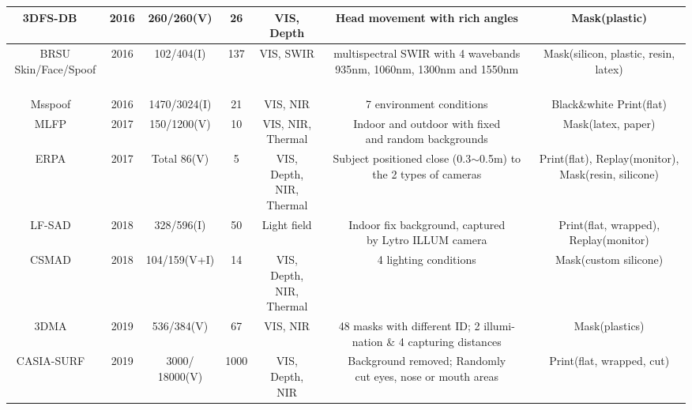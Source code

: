 \documentclass[10pt,journal,compsoc]{IEEEtran}
\begin{document}
\begin{table}
{\begin{tabular}{c c c c c c c}
\midrule
3DFS-DB
~\cite{galbally2016three} & 2016 & 260/260(V) & 26 & VIS, Depth &  Head movement with rich angles & Mask(plastic)\\

 \midrule
\tabincell{c}{BRSU \\ Skin/Face/Spoof}
~\cite{steiner2016reliable} & 2016 & 102/404(I) & 137 & VIS, SWIR &  \tabincell{c}{ multispectral SWIR with 4 wavebands \\935nm, 1060nm, 1300nm and 1550nm} & Mask(silicon, plastic, resin, latex)\\

 \midrule
Msspoof
~\cite{chingovska2016face} & 2016 & 1470/3024(I) & 21 & VIS, NIR &  7 environment conditions & Black\&white Print(flat)\\


 \midrule
MLFP
~\cite{agarwal2017face} & 2017 & 150/1200(V) & 10 & \tabincell{c}{VIS, NIR, \\Thermal} &  \tabincell{c}{Indoor and outdoor with fixed\\ and random backgrounds} & Mask(latex, paper)\\

 \midrule
ERPA
~\cite{bhattacharjee2017you} & 2017 & Total 86(V) & 5 & \tabincell{c}{VIS, Depth, \\NIR, Thermal} &  \tabincell{c}{Subject positioned close (0.3$\sim$0.5m)\\ to the 2 types of cameras} & \tabincell{c}{Print(flat), Replay(monitor), \\ Mask(resin, silicone)}\\


 \midrule
LF-SAD
~\cite{liu2019light} & 2018 &  328/596(I)  & 50 & Light field &  \tabincell{c}{Indoor fix background, captured\\ by Lytro ILLUM camera}  & Print(flat, wrapped), Replay(monitor)\\


 \midrule
CSMAD
~\cite{bhattacharjee2018spoofing} & 2018 &  104/159(V+I)  & 14 & \tabincell{c}{VIS, Depth, \\NIR, Thermal} &  4 lighting conditions  & Mask(custom silicone)\\

 \midrule
3DMA
~\cite{xiao20193dma} & 2019 & 536/384(V) & 67 & VIS, NIR &  \tabincell{c}{48 masks with different ID; 2 illumi-\\ nation \& 4 capturing distances}  & Mask(plastics)\\


 \midrule
CASIA-SURF
~\cite{casiasurf} & 2019 &  \tabincell{c}{3000/\\18000(V)} & 1000 &  \tabincell{c}{VIS, Depth,\\ NIR} &  \tabincell{c}{Background removed; Randomly \\cut  eyes, nose or mouth areas}  & Print(flat, wrapped, cut)\\



\end{tabular}}
\end{table}
\end{document}
